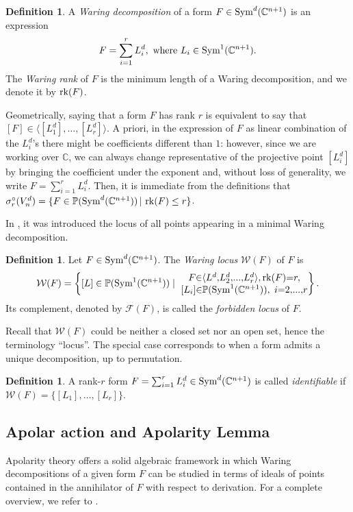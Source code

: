 \documentclass{amsart}
\numberwithin{theorem}{section}
\theoremstyle{definition}
\newtheorem{definition}[theorem]{Definition}
\newcommand{\W}{\mathcal{W}}
\newcommand{\PP}{\mathbb{P}}
\newcommand{\CC}{\mathbb{C}}
\newcommand{\rk}{\mathop{\rm rk}\nolimits}
\newcommand{\sym}{\mathop{\rm Sym}\nolimits}
\begin{document}
 
\begin{definition}
    A \emph{Waring decomposition} of a form $F\in \sym^d(\CC^{n+1})$ is an expression 
    \[
        F=\sum_{i=1}^r L_i^d, \text{ where }L_i\in \sym^1(\CC^{n+1}).
    \]
    The \emph{Waring rank} of $F$ is the minimum length of a Waring decomposition, and we denote it by $\rk(F)$.
\end{definition}
Geometrically, saying that a form $F$ has rank $r$ is equivalent to say that $[F] \in \langle [L_1^d],\ldots,[L_r^d]\rangle.$ A priori, in the expression of $F$ as linear combination of the $L^d_i$'s there might be coefficients different than $1$: however, since we are working over $\CC$, we can always change representative of the projective point $[L_i^d]$ by bringing the coefficient under the exponent and, without loss of generality, we write $F = \sum_{i=1}^r L_i^d$. Then, it is immediate from the definitions that $\sigma_r^\circ(V^d_n)=\{F\in \PP(\sym^d(\CC^{n+1}))\, |\, \rk(F)\leq r \}$. 

In \cite{carlini2017waring}, it was introduced the locus of all points appearing in a minimal Waring decomposition.
\begin{definition}
Let $F\in \sym^d(\CC^{n+1})$. The \emph{Waring locus} $\W(F)$ of $F$ is
\begin{align*}
    \mathcal W(F)=\left\{[L]\in \PP(\sym^1(\CC^{n+1}))\mid\ \Large{\substack{F\in \langle L^d,L_2^d,\dots, L_r^d\rangle,\,  \rk(F)=r,\\
     [L_i]\in \PP(\sym^1(\CC^{n+1})),\ i=2,\dots,r}}\right\}. 
\end{align*}
Its complement, denoted by $\mathcal F(F)$, is called the \emph{forbidden locus} of $F$.
\end{definition}
Recall that $\W(F)$ could be neither a closed set nor an open set, hence the terminology ``locus''. The special case corresponds to when a form admits a unique decomposition, up to permutation.

\begin{definition}
A rank-$r$ form $F=\sum_{i=1}^rL_i^d\in \sym^d(\CC^{n+1})$ is called \emph{identifiable} if $\W(F)=\{[L_1],\dots,[L_r]\}$.    
\end{definition}

\subsection{Apolar action and Apolarity Lemma}
Apolarity theory offers a solid algebraic framework in which Waring decompositions of a given form $F$ can be studied in terms of ideals of points contained in the annihilator of $F$ with respect to derivation. For a complete overview, we refer to \cite{IarrobinoKanev}. 
\end{document}
